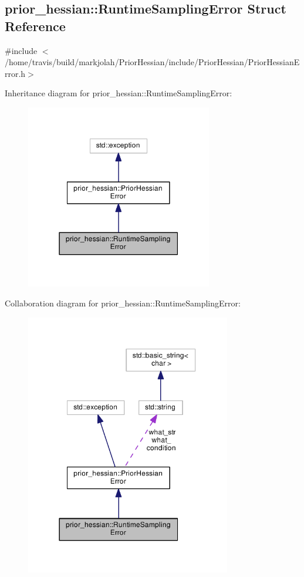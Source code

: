 \hypertarget{structprior__hessian_1_1RuntimeSamplingError}{}\subsection{prior\+\_\+hessian\+:\+:Runtime\+Sampling\+Error Struct Reference}
\label{structprior__hessian_1_1RuntimeSamplingError}


{\ttfamily \#include $<$/home/travis/build/markjolah/\+Prior\+Hessian/include/\+Prior\+Hessian/\+Prior\+Hessian\+Error.\+h$>$}



Inheritance diagram for prior\+\_\+hessian\+:\+:Runtime\+Sampling\+Error\+:\nopagebreak
\begin{figure}[H]
\begin{center}
\leavevmode
\includegraphics[width=231pt]{structprior__hessian_1_1RuntimeSamplingError__inherit__graph}
\end{center}
\end{figure}


Collaboration diagram for prior\+\_\+hessian\+:\+:Runtime\+Sampling\+Error\+:\nopagebreak
\begin{figure}[H]
\begin{center}
\leavevmode
\includegraphics[width=254pt]{structprior__hessian_1_1RuntimeSamplingError__coll__graph}
\end{center}
\end{figure}
